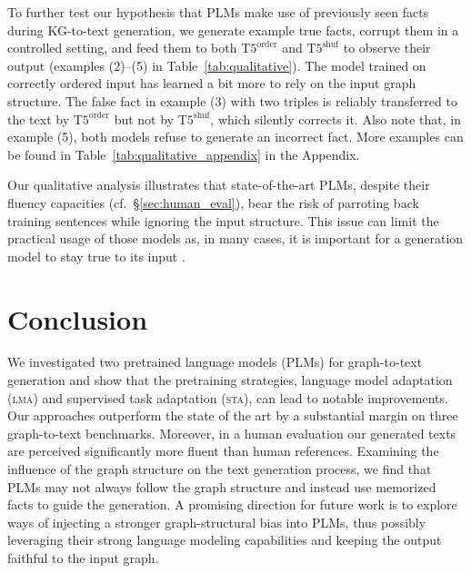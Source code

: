 \documentclass[11pt]{article}
\newcommand{\shufmodel}[3]{\ensuremath{\text{#1}^{\text{#3}}}}
\begin{document}
\begin{table}[t]
To further test our hypothesis that
PLMs make use of previously seen facts
during KG-to-text generation, we generate example true facts, corrupt them in a controlled setting, and feed them to both \shufmodel{T5}{small}{order} and \shufmodel{T5}{small}{shuf} to observe their output (examples (2)--(5) in Table~\ref{tab:qualitative}).
The model trained on correctly ordered input has learned a bit more to rely on the input graph structure. 
The false fact in example (3) with two triples is reliably transferred to the text by \shufmodel{T5}{small}{order} but not by \shufmodel{T5}{small}{shuf}, which silently corrects it.
Also note that, in example (5), both models refuse to generate an incorrect fact. More examples can be found in Table~\ref{tab:qualitative_appendix} in the Appendix.

Our qualitative analysis illustrates that state-of-the-art PLMs, despite their fluency capacities (cf.\ \S\ref{sec:human_eval}), bear the risk of parroting back training sentences while ignoring the input structure. This issue can limit the practical usage of those models as, in many cases, it is important for a generation model to stay true to its input \cite{wiseman-etal-2017-challenges, falke-etal-2019-ranking}.












\section{Conclusion}

We investigated two pretrained language models (PLMs) for graph-to-text generation and show that the pretraining strategies, language model adaptation (\textsc{lma}) and supervised task adaptation (\textsc{sta}), can lead to notable improvements. Our approaches outperform the state of the art by a substantial margin on three graph-to-text benchmarks. Moreover, in a human evaluation our generated texts are perceived significantly more fluent than human references. Examining the influence of the graph structure on the text generation process, we find that PLMs may not always follow the graph structure and instead use memorized facts to guide the generation. A promising direction for future work is to explore ways of injecting a stronger graph-structural bias into PLMs, thus possibly leveraging their strong language modeling capabilities and keeping the output faithful to the input graph.



\end{table}
\end{document}

